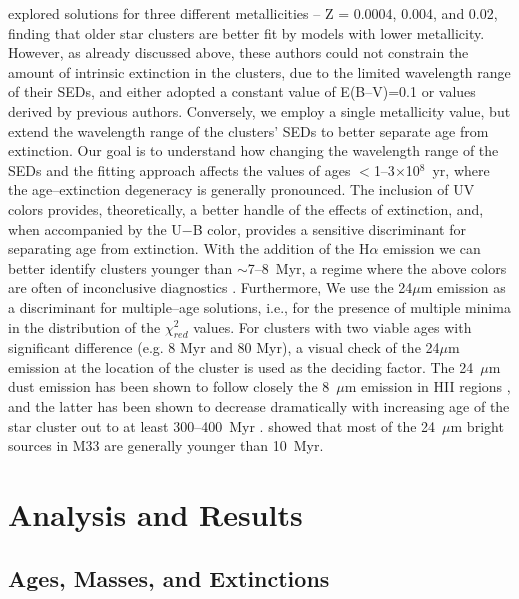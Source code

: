 \documentclass{aastex63}
\begin{document}
\citet{Ma+2001} explored solutions for three different metallicities -- Z = 0.0004, 0.004, and 0.02, finding that older star clusters are better fit by models with lower metallicity. However, as already discussed above, these authors could not constrain the amount of intrinsic extinction in the clusters, due to the limited wavelength range of their SEDs, and either adopted a constant value of E(B--V)=0.1 or values derived by previous authors. Conversely, we employ a single metallicity value, but extend the wavelength range of the clusters' SEDs to better separate age from extinction. Our goal is to understand how changing the wavelength range of the SEDs and the fitting approach affects the values of ages $<$1--3$\times$10$^8$~yr, where the age--extinction degeneracy is generally pronounced. The inclusion of UV colors  provides, theoretically, a better handle of the effects of extinction, and, when accompanied by the U$-$B color, provides a sensitive discriminant for separating age from extinction. With the addition of the H$\alpha$ emission we can better identify clusters younger than $\sim$7--8~Myr, a regime where the above colors are often of inconclusive diagnostics \citep[see discussions in][]{Boquien+2009, Calzetti2013, Calzetti+2015}. Furthermore, We use the 24$\mu$m emission as a discriminant for multiple--age solutions, i.e., for the presence of multiple minima in the distribution of the $\chi^2_{red}$ values. For clusters with two viable ages with  significant difference (e.g. 8 Myr and 80 Myr), a visual check of the 24$\mu$m emission at the location of the cluster is used as the deciding factor. The 24~$\mu$m dust emission has been shown to follow closely the 8~$\mu$m emission in HII regions \citep{Relano2009}, and the latter has been shown to decrease dramatically with increasing age of the star cluster out to at least 300--400~Myr \citep{Lin+2020}. \citet{Sharma+2011} showed that most of  the 24~$\mu$m bright sources in M33 are generally younger than 10~Myr.


\section{Analysis and Results} \label{analysis}

\subsection{Ages, Masses, and Extinctions}
\end{document}
